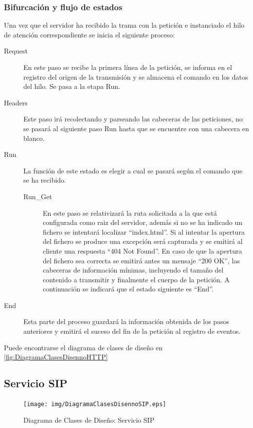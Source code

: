 \documentclass[a4paper,spanish,12pt]{book}
\begin{document}
\subsubsection{Bifurcación y flujo de estados} 
Una vez que el servidor ha recibido la trama con la petición e instanciado el hilo de atención correspondiente se inicia el siguiente proceso:
\begin{description}
	\item[Request] En este paso se recibe la primera línea de la petición, se informa en el registro del origen de la transmisión y se almacena el comando en los datos del hilo. Se pasa a la etapa Run.
	\item[Headers] Este paso irá recolectando y parseando las cabeceras de las peticiones, no se pasará al siguiente paso Run hasta que se encuentre con una cabecera en blanco.
	\item[Run] La función de este estado es elegir a cual se pasará según el comando que se ha recibido.
	\begin{description}
		\item[Run\_Get] En este paso se relativizará la ruta solicitada a la que está configurada como raiz del servidor, además si no se ha indicado un fichero se intentará localizar ``index.html''. Si al intentar la apertura del fichero se produce una excepción será capturada y se emitirá al cliente una respuesta ``404 Not Found''. En caso de que la apertura del fichero sea correcta se emitirá antes un mensaje ``200 OK'', las cabeceras de información mínimas, incluyendo el tamaño del contenido a transmitir y finalmente el cuerpo de la petición. A continuación se indicará que el estado siguiente es ``End''.
	\end{description}
	\item[End] Esta parte del proceso guardará la información obtenida de los pasos anteriores y emitirá el suceso del fin de la petición al registro de eventos.
\end{description}
Puede encontrarse el diagrama de clases de diseño en \ref{fig:DiagramaClasesDisennoHTTP} 
\subsection{Servicio SIP}
\begin{figure}[h]
		\begin{center}
				\texttt{[image: img/DiagramaClasesDisennoSIP.eps]}	
			\end{center}
			\caption{Diagrama de Clases de Diseño: Servicio SIP}
			  \label{fig:DiagramaClasesDisennoSIP}
\end{figure}
\end{document}
